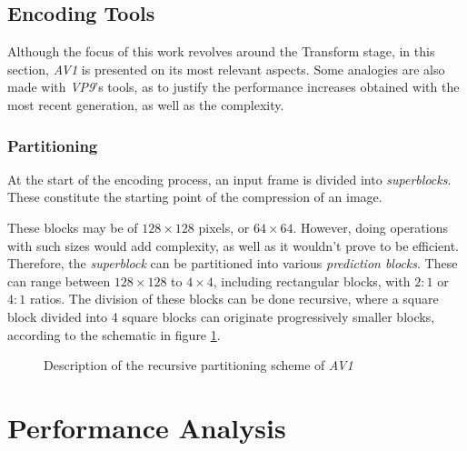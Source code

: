 \subsection{Encoding Tools}

Although the focus of this work revolves around the Transform stage, in this section, \emph{AV1} is presented on its most relevant aspects. Some analogies are also made with \emph{VP9}'s tools, as to justify the performance increases obtained with the most recent generation, as well as the complexity.

\subsubsection{Partitioning}

At the start of the encoding process, an input frame is divided into \emph{superblocks}. These constitute the starting point of the compression of an image.

These blocks may be of $128 \times 128$ pixels, or $64 \times 64$. However, doing operations with such sizes would add complexity, as well as it wouldn't prove to be efficient. Therefore, the \emph{superblock} can be partitioned into various \emph{prediction blocks}. These can range between $128 \times 128$ to $4 \times 4$, including rectangular blocks, with $2:1$ or $4:1$ ratios. The division of these blocks can be done recursive, where a square block divided into 4 square blocks can originate progressively smaller blocks, according to the schematic in figure \ref{fig:partitioning}.

\begin{figure}[!htbp]
    \centering
    
    \caption{Description of the recursive partitioning scheme of \emph{AV1}} 
    \label{fig:partitioning}
\end{figure}



\section{Performance Analysis}


\clearpage
\printbibliography[heading=subbibliography]

